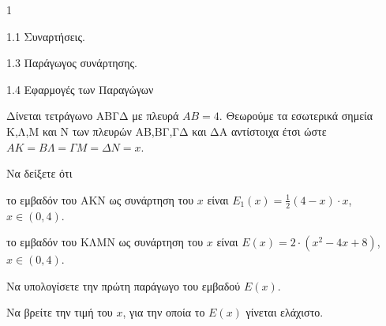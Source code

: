\begin{ylh}{1}
    \item 1.1 Συναρτήσεις.
    \item 1.3 Παράγωγος συνάρτησης.
    \item 1.4 Εφαρμογές των Παραγώγων
\end{ylh}
\begin{center} 
    \centering
\end{center}
Δίνεται τετράγωνο ΑΒΓΔ με πλευρά $ΑΒ = 4$. Θεωρούμε τα εσωτερικά σημεία Κ,Λ,Μ και Ν των πλευρών ΑΒ,ΒΓ,ΓΔ και ΔΑ αντίστοιχα έτσι ώστε $ΑΚ = ΒΛ = ΓΜ = ΔΝ = x$.

\begin{alist}
\item Να δείξετε ότι
    \begin{rlist}
        \item το εμβαδόν του ΑΚΝ ως συνάρτηση του $x$ είναι $E_1(x) = \frac{1}{2}(4-x) \cdot x$, $x \in (0,4)$. 
        \item το εμβαδόν του ΚΛΜΝ ως συνάρτηση του $x$ είναι $E(x) = 2 \cdot (x^2 - 4x + 8)$, $x \in (0,4)$. 
    \end{rlist}
\item Να υπολογίσετε την πρώτη παράγωγο του εμβαδού $E(x)$. 
\item Να βρείτε την τιμή του $x$, για την οποία το $E(x)$ γίνεται ελάχιστο. 
\end{alist}

